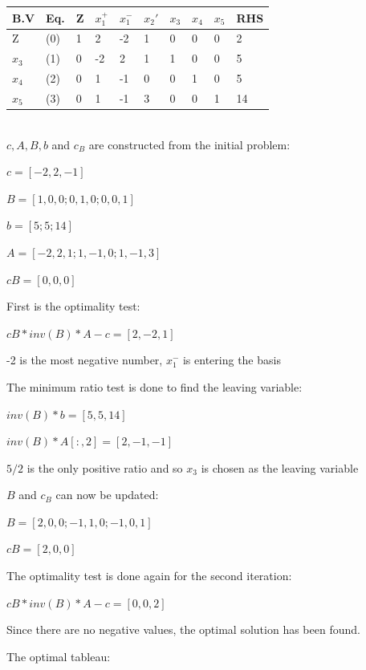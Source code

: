 \documentclass{article}
\begin{document}
\vspace{5mm}
\begin{tabular}{|l|l|l|l l l l l l|l|}
  \hline
  B.V           & Eq. & Z & $x_1^+$& $x_1^-$& $x_2'$ & $x_3$ & $x_4$ & $x_5$ & RHS \\ \hline
  Z             & (0) & 1 & 2  & -2 & 1  & 0  & 0  & 0  & 2   \\ \hline
  $x_3$         & (1) & 0 & -2 & 2  & 1  & 1  & 0  & 0  & 5  \\ \hline
  $x_4$         & (2) & 0 & 1  & -1 & 0  & 0  & 1  & 0  & 5 \\ \hline
  $x_5$         & (3) & 0 & 1  & -1 & 3  & 0  & 0  & 1  & 14 \\ \hline
\end{tabular}
\vspace{5mm}
\\

$c, A, B, b$ and $c_B$ are constructed from the initial problem:

$c=[-2, 2, -1]$

$B=[1, 0, 0; 0, 1, 0; 0, 0, 1]$

$b=[5; 5; 14]$

$A=[-2, 2, 1; 1, -1, 0; 1, -1, 3]$

$cB=[0, 0, 0]$

\vspace{5mm}
First is the optimality test:

$cB*inv(B)*A-c=[2, -2, 1]$

-2 is the most negative number, $x_1^-$ is entering the basis

\vspace{5mm}
The minimum ratio test is done to find the leaving variable:

$inv(B)*b=[5, 5, 14]$

$inv(B)*A[:,2]=[2, -1, -1]$

$5/2$ is the only positive ratio and so $x_3$ is chosen as the leaving variable

\vspace{5mm}
$B$ and $c_B$ can now be updated:

$B=[2, 0, 0; -1, 1, 0; -1, 0, 1]$

$cB=[2, 0, 0]$

The optimality test is done again for the second iteration:

$cB*inv(B)*A-c=[0,0,2]$

Since there are no negative values, the optimal solution has been found.

\vspace{5mm}
The optimal tableau:
\end{document}
